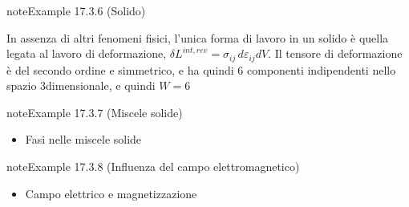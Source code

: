 \documentclass[letterpaper,10pt,italian]{jupyterBook}
\begin{document}
\label{ch/thermodynamics/principles-gibbs-phase-rule:example-9}
\begin{sphinxadmonition}{note}{Example 17.3.6 (Solido)}



\sphinxAtStartPar
In assenza di altri fenomeni fisici, l’unica forma di lavoro in un solido è quella legata al lavoro di deformazione, \(\delta L^{int,rev} = \sigma_{ij} \, d \varepsilon_{ij} dV\). Il tensore di deformazione è del secondo ordine e simmetrico, e ha quindi 6 componenti indipendenti nello spazio 3\sphinxhyphen{}dimensionale, e quindi \(W=6\)
\end{sphinxadmonition}
\label{ch/thermodynamics/principles-gibbs-phase-rule:example-10}
\begin{sphinxadmonition}{note}{Example 17.3.7 (Miscele solide)}


\begin{itemize}
\item {} 
\sphinxAtStartPar
Fasi nelle miscele solide 

\end{itemize}
\end{sphinxadmonition}
\label{ch/thermodynamics/principles-gibbs-phase-rule:example-11}
\begin{sphinxadmonition}{note}{Example 17.3.8 (Influenza del campo elettromagnetico)}


\begin{itemize}
\item {} 
\sphinxAtStartPar
Campo elettrico e magnetizzazione 

\end{itemize}
\end{sphinxadmonition}
\end{document}
